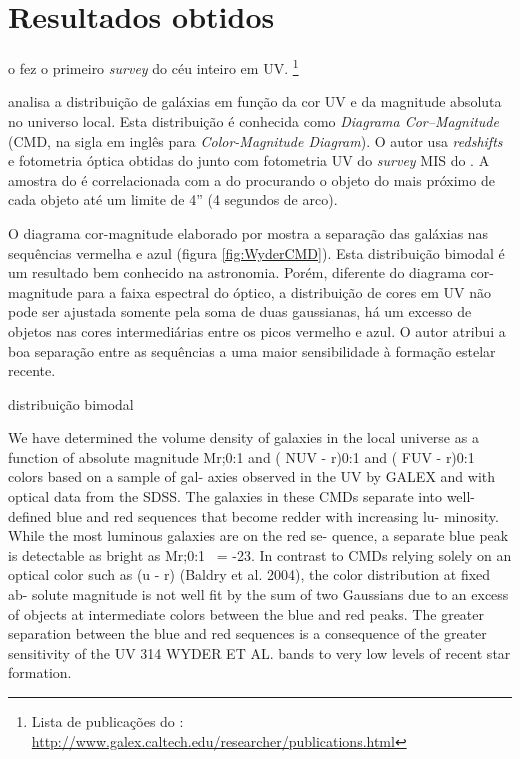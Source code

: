 \section{Resultados obtidos}
\label{sec:Galex:Resultados}

o \galex fez o primeiro {\em survey} do céu inteiro em UV. 
\footnote{Lista de publicações do \galex:
\url{http://www.galex.caltech.edu/researcher/publications.html}}


\cite{Wyder2007} analisa a distribuição de galáxias em função da cor UV e da
magnitude absoluta no universo local. Esta distribuição é conhecida como {\em
Diagrama Cor--Magnitude} (CMD, na sigla em inglês para {\em Color-Magnitude
Diagram}). O autor usa {\em redshifts} e fotometria óptica obtidas do \SDSS
junto com fotometria UV do {\em survey} MIS do \galex. A amostra do \SDSS é
correlacionada com a do \galex procurando o objeto do \galex mais próximo de
cada objeto \SDSS até um limite de 4'' (4 segundos de arco).

O diagrama cor-magnitude elaborado por \cite{Wyder2007} mostra a separação das
galáxias nas sequências vermelha e azul (figura \ref{fig:WyderCMD}). Esta
distribuição bimodal é um resultado bem conhecido na astronomia. Porém,
diferente do diagrama cor-magnitude para a faixa espectral do óptico, a
distribuição de cores em UV não pode ser ajustada somente pela soma de duas
gaussianas, há um excesso de objetos nas cores intermediárias entre os picos
vermelho e azul. O autor atribui a boa separação entre as sequências a uma maior
sensibilidade à formação estelar recente.

distribuição bimodal 


We have determined the volume density of galaxies
in the local universe as a function of absolute magnitude Mr;0:1 and ( NUV -
r)0:1 and ( FUV - r)0:1 colors based on a sample of gal- axies observed in the
UV by GALEX and with optical data from the SDSS. The galaxies in these CMDs
separate into well-defined blue and red sequences that become redder with
increasing lu- minosity. While the most luminous galaxies are on the red se-
quence, a separate blue peak is detectable as bright as Mr;0:1 ~= -23. In
contrast to CMDs relying solely on an optical color such as (u - r) (Baldry et
al. 2004), the color distribution at fixed ab- solute magnitude is not well fit
by the sum of two Gaussians due to an excess of objects at intermediate colors
between the blue and red peaks. The greater separation between the blue and red
sequences is a consequence of the greater sensitivity of the UV 314 WYDER ET AL.
bands to very low levels of recent star formation. 

